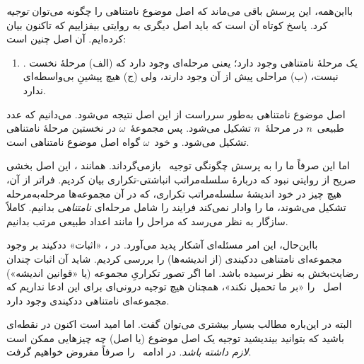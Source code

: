 \documentclass[../../../include/open-logic-section]{subfiles}
\begin{document}
بااین‌همه، این پرسش باقی می‌ماند که اصل موضوع نامتناهی را چگونه می‌توان
\emph{توجیه} کرد. پاسخ کوتاه آن است که باید اصل دیگری به روایتی بیفزاییم
که تاکنون بیان کرده‌ایم. آن اصل چنین است:
\begin{enumerate}
	\item[] \stagesinf. یک مرحلهٔ نامتناهی وجود دارد؛ یعنی مرحله‌ای وجود دارد که (الف) مرحلهٔ نخست نیست، (ب) مراحلی پیش از آن وجود دارند، ولی (ج) هیچ پیشینِ بی‌واسطه‌ای ندارد.
\end{enumerate}
اصل موضوع نامتناهی به‌طور سرراست از این اصل نتیجه می‌شود. می‌دانیم که عدد
طبیعی~$n$ در مرحلهٔ~$n$ تشکیل می‌شود. پس مجموعهٔ~$\omega$ در نخستین
مرحلهٔ نامتناهی تشکیل می‌شود. و خود~$\omega$ گواه اصل موضوع نامتناهی است.

اما این صرفاً ما را به پرسش چگونگی توجیه~\stagesinf{} بازمی‌گرداند. همانند
\stagessucc، این اصل بخشی صریح از روایتی نبود که دربارهٔ سلسله‌مراتب
انباشتی-تکراری بیان کردیم. فراتر از آن، هیچ چیز در خود اندیشهٔ
سلسله‌مراتب تکراری، که در آن مجموعه‌ها مرحله‌به‌مرحله تشکیل می‌شوند، ما را
وادار نمی‌کند فرایند را شامل مرحله‌ای \emph{نامتناهی} بدانیم. کاملاً
سازگار به نظر می‌رسد که مراحل را مانند اعداد طبیعی مرتب بدانیم.

بااین‌حال، این امر مسئله‌ای آشکار پدید می‌آورد. در
، «اثبات» ددکیند بر وجود
مجموعه‌ای نامتناهی ددکیندی (از اندیشه‌ها) را بررسی کردیم. شاید آن اثبات
چندان رضایت‌بخش به نظر نرسیده باشد. اما اگر تصور تکراریِ مجموعه (یا
«قوانین اندیشه») اصل~\stagesinf{} را «بر ما تحمیل نکند»، همچنان هیچ
توجیه درونی‌ای برای این ادعا نداریم که مجموعه‌ای نامتناهی ددکیندی وجود دارد.

البته در این‌باره مطالب بسیار بیشتری می‌توان گفت. اما امید است اکنون در
نقطه‌ای باشید که بتوانید بیندیشید توجیه یک اصل موضوع (یا اصل) چه چیزهایی
ممکن است \emph{لازم داشته باشد}. در ادامه~\stagesinf{} را صرفاً مفروض
خواهیم گرفت.
\end{document}
